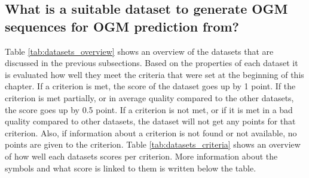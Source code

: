 \subsection{What is a suitable dataset to generate \gls{OGM} sequences for \gls{OGM} prediction from?} \label{subsec:data_con}
Table \ref{tab:datasets_overview} shows an overview of the datasets that are discussed in the previous subsections. Based on the properties of each dataset it is evaluated how well they meet the criteria that were set at the beginning of this chapter. If a criterion is met, the score of the dataset goes up by 1 point. If the criterion is met partially, or in average quality compared to the other datasets, the score goes up by 0.5 point. If a criterion is not met, or if it is met in a bad quality compared to other datasets, the dataset will not get any points for that criterion. Also, if information about a criterion is not found or not available, no points are given to the criterion. Table \ref{tab:datasets_criteria} shows an overview of how well each datasets scores per criterion. More information about the symbols and what score is linked to them is written below the table. \\

